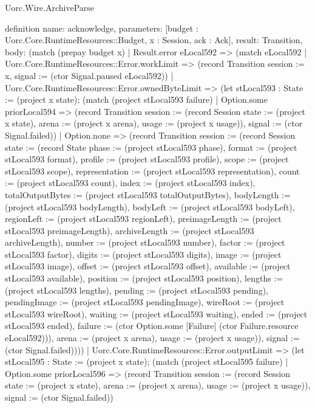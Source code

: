 \begin{lexlean}{Uorc.Wire.ArchiveParse}
\begin{semanticmodule}
definition{
  name: acknowledge,
  parameters: [budget : Uorc.Core.RuntimeResources::Budget, x : Session, ack : Ack],
  result: Transition,
  body: (match (prepay budget x)
    | Result.error eLocal592 => (match eLocal592
      | Uorc.Core.RuntimeResources::Error.workLimit => (record Transition {session := x, signal := (ctor Signal.paused eLocal592)})
      | Uorc.Core.RuntimeResources::Error.ownedByteLimit => (let stLocal593 : State := (project x state); (match (project stLocal593 failure)
        | Option.some priorLocal594 => (record Transition {session := (record Session {state := (project x state), arena := (project x arena), usage := (project x usage)}), signal := (ctor Signal.failed)})
        | Option.none => (record Transition {session := (record Session {state := (record State {phase := (project stLocal593 phase), format := (project stLocal593 format), profile := (project stLocal593 profile), scope := (project stLocal593 scope), representation := (project stLocal593 representation), count := (project stLocal593 count), index := (project stLocal593 index), totalOutputBytes := (project stLocal593 totalOutputBytes), bodyLength := (project stLocal593 bodyLength), bodyLeft := (project stLocal593 bodyLeft), regionLeft := (project stLocal593 regionLeft), preimageLength := (project stLocal593 preimageLength), archiveLength := (project stLocal593 archiveLength), number := (project stLocal593 number), factor := (project stLocal593 factor), digits := (project stLocal593 digits), image := (project stLocal593 image), offset := (project stLocal593 offset), available := (project stLocal593 available), position := (project stLocal593 position), lengths := (project stLocal593 lengths), pending := (project stLocal593 pending), pendingImage := (project stLocal593 pendingImage), wireRoot := (project stLocal593 wireRoot), waiting := (project stLocal593 waiting), ended := (project stLocal593 ended), failure := (ctor Option.some [Failure] (ctor Failure.resource eLocal592))}), arena := (project x arena), usage := (project x usage)}), signal := (ctor Signal.failed)})))
      | Uorc.Core.RuntimeResources::Error.outputLimit => (let stLocal595 : State := (project x state); (match (project stLocal595 failure)
        | Option.some priorLocal596 => (record Transition {session := (record Session {state := (project x state), arena := (project x arena), usage := (project x usage)}), signal := (ctor Signal.failed)})
}
\end{semanticmodule}
\end{lexlean}
